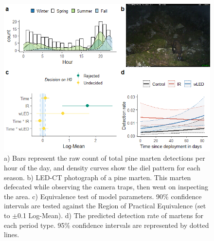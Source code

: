 \begin{figure}
	\centering
	\includegraphics[width=13cm]{../R/glmm_sp_files/figure-html/maar2-1.png}
	\caption[Pine marten]
	{\footnotesize
		a) Bars represent the raw count of total pine marten detections per hour of the day, and density curves show the diel pattern for each season.
		b) LED-CT photograph of a pine marten. This marten defecated while observing the camera traps, then went on inspecting the area.
		c) Equivalence test of model parameters. 90\% confidence intervals are tested against the Region of Practical Equivalence (set to $\pm$0.1 Log-Mean).
		d) The predicted detection rate of martens for each period type. 95\% confidence intervals are represented by dotted lines.}
	\label{maar}
\end{figure}

